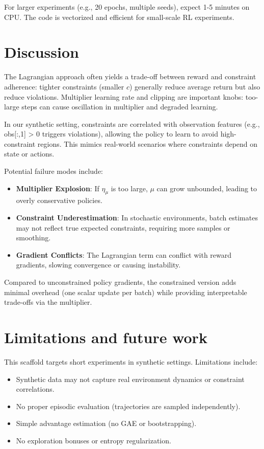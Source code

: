For larger experiments (e.g., 20 epochs, multiple seeds), expect 1-5 minutes on CPU. The code is vectorized and efficient for small-scale RL experiments.

\section{Discussion}
\label{sec:discussion}

The Lagrangian approach often yields a trade-off between reward and constraint adherence: tighter constraints (smaller $c$) generally reduce average return but also reduce violations. Multiplier learning rate and clipping are important knobs: too-large steps can cause oscillation in multiplier and degraded learning.

In our synthetic setting, constraints are correlated with observation features (e.g., obs[:,1] > 0 triggers violations), allowing the policy to learn to avoid high-constraint regions. This mimics real-world scenarios where constraints depend on state or actions.

Potential failure modes include:
\begin{itemize}
  \item \textbf{Multiplier Explosion}: If $\eta_\mu$ is too large, $\mu$ can grow unbounded, leading to overly conservative policies.
  \item \textbf{Constraint Underestimation}: In stochastic environments, batch estimates may not reflect true expected constraints, requiring more samples or smoothing.
  \item \textbf{Gradient Conflicts}: The Lagrangian term can conflict with reward gradients, slowing convergence or causing instability.
\end{itemize}

Compared to unconstrained policy gradients, the constrained version adds minimal overhead (one scalar update per batch) while providing interpretable trade-offs via the multiplier.

\section{Limitations and future work}
\label{sec:limitations}

This scaffold targets short experiments in synthetic settings. Limitations include:
\begin{itemize}
  \item Synthetic data may not capture real environment dynamics or constraint correlations.
  \item No proper episodic evaluation (trajectories are sampled independently).
  \item Simple advantage estimation (no GAE or bootstrapping).
  \item No exploration bonuses or entropy regularization.
\end{itemize}


